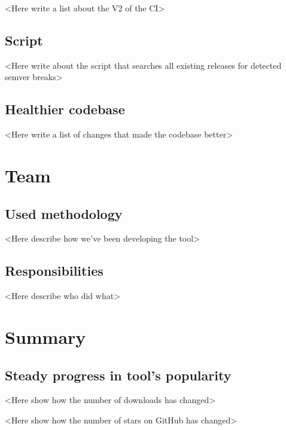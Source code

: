 \documentclass[licencjacka,en]{pracamgr}
\begin{document}
<Here write a list about the V2 of the CI>


\section{Script}

<Here write about the script that searches all existing releases for detected semver breaks>


\section{Healthier codebase}

<Here write a list of changes that made the codebase better>



\chapter{Team}\label{r:team}

\section{Used methodology}

<Here describe how we've been developing the tool>


\section{Responsibilities}

<Here describe who did what>



\chapter{Summary}\label{r:summary}

\section{Steady progress in tool's popularity}

<Here show how the number of downloads has changed>

<Here show how the number of stars on GitHub has changed>
\end{document}
